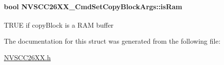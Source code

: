 \paragraph[{is\+Ram}]{\setlength{\rightskip}{0pt plus 5cm}bool N\+V\+S\+C\+C26\+X\+X\+\_\+\+Cmd\+Set\+Copy\+Block\+Args\+::is\+Ram}\label{struct_n_v_s_c_c26_x_x___cmd_set_copy_block_args_ae5d8cf9c7fd9fcc7ab27f03f6310df68}
T\+R\+U\+E if copy\+Block is a R\+A\+M buffer 

The documentation for this struct was generated from the following file\+:\begin{DoxyCompactItemize}
\item 
\hyperlink{_n_v_s_c_c26_x_x_8h}{N\+V\+S\+C\+C26\+X\+X.\+h}\end{DoxyCompactItemize}
